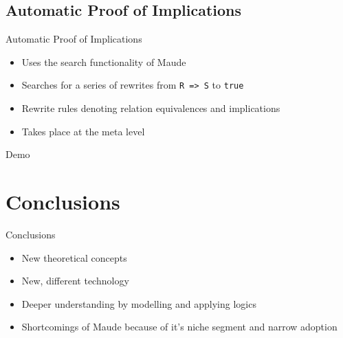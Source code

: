 \documentclass{beamer}
\begin{document}
\subsection{Automatic Proof of Implications}
\begin{frame}{Automatic Proof of Implications}
\begin{itemize}
	\item Uses the \alert{search} functionality of Maude
	\item Searches for a series of \alert{rewrites} from \texttt{R => S} to \texttt{true}  
	\item Rewrite rules denoting relation equivalences and implications
	\item Takes place at the meta level
\end{itemize}
\end{frame}

\begin{frame}{Demo}
\end{frame}
\section*{Conclusions}

\begin{frame}{Conclusions}
  \begin{itemize}
  \item New theoretical concepts 
  \item New, different technology
  \item Deeper understanding by modelling and applying logics
  \item Shortcomings of Maude because of it's niche segment and narrow adoption
  \end{itemize}
 
\end{frame}
\end{document}
